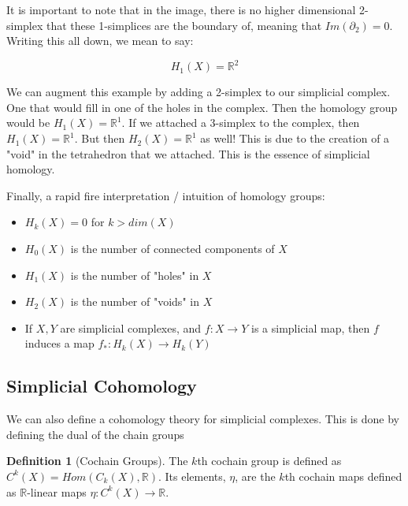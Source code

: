 \documentclass[12pt]{article}
\theoremstyle{plain}
\theoremstyle{definition}
\newtheorem{definition}[thm]{Definition}
\begin{document}
It is important to note that in the image, there is no higher dimensional 2-simplex that these 1-simplices are the
boundary of, meaning that $Im(\partial_2) = 0$. Writing this all down, we mean to say:

\begin{equation*}
  H_1(X) = \mathbb{R}^2
\end{equation*}

We can augment this example by adding a 2-simplex to our simplicial complex. One that would fill in one of the holes
in the complex. Then the homology group would be $H_1(X) = \mathbb{R}^1$. If we attached a 3-simplex to the complex, 
then $H_1(X) = \mathbb{R}^1$. But then $H_2(X) = \mathbb{R}^1$ as well! This is due to the creation of a "void" in the
tetrahedron that we attached.  This is the essence of simplicial homology.

Finally, a rapid fire interpretation / intuition of homology groups:

\begin{itemize}

\item $H_k(X) = 0$ for $k > dim(X)$

\item $H_0(X)$ is the number of connected components of $X$

\item $H_1(X)$ is the number of "holes" in $X$

\item $H_2(X)$ is the number of "voids" in $X$

\item If $X, Y$ are simplicial complexes, and $f: X \to Y$ is a simplicial map, then $f$ induces a map $f_*: H_k(X) \to H_k(Y)$

\end{itemize}


\subsection{Simplicial Cohomology}

We can also define a cohomology theory for simplicial complexes. This is done by defining the dual of the chain groups

\begin{definition}[Cochain Groups] 
  The $k$th cochain group is defined as $C^k(X) = Hom(C_k(X), \mathbb{R})$. Its elements, $\eta$, are the $k$th cochain maps 
  defined as $\mathbb{R}$-linear maps $\eta: C^k(X) \to \mathbb{R}$. 
\end{definition}
\end{document}
